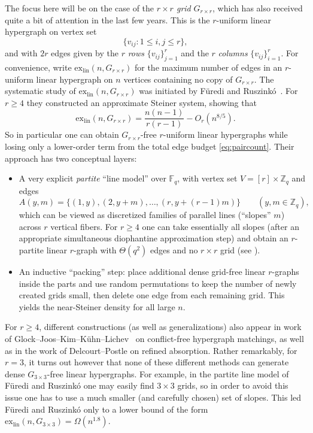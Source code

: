 \documentclass[11pt]{article}
\theoremstyle{definition}
\theoremstyle{remark}
\newcommand{\F}{\mathbb{F}}
\begin{document}
The focus here will be on the case of the \emph{$r\times r$ grid} $G_{r\times r}$, which has also received quite a bit of attention in the last few years. This is the $r$-uniform linear hypergraph on vertex set
\[
\{v_{ij}: 1\le i,j\le r\},
\]
and with $2r$ edges given by the $r$ \emph{rows} $\{v_{ij}\}_{j=1}^r$ and the $r$ \emph{columns} $\{v_{ij}\}_{i=1}^r$.
For convenience, write $\mathrm{ex}_{\mathrm{lin}}(n,G_{r\times r})$ for the maximum number of edges in an $r$-uniform linear hypergraph on $n$ vertices containing no copy of $G_{r\times r}$.
The systematic study of $\mathrm{ex}_{\mathrm{lin}}(n,G_{r\times r})$ was initiated by F\"uredi and Ruszink\'o~\cite{FurediRuszinko}. For $r\ge4$ they constructed an approximate Steiner system, showing that
\[
\mathrm{ex}_{\mathrm{lin}}(n,G_{r\times r})
=
\frac{n(n-1)}{r(r-1)}-O_r(n^{8/5}).
\]
So in particular one can obtain $G_{r\times r}$-free $r$-uniform linear hypergraphs while losing only a lower-order term from the total edge budget \eqref{eq:paircount}. Their approach has two conceptual layers:
\begin{itemize}[leftmargin=2em]
\item
A very explicit \emph{partite} ``line model'' over $\F_q$, with vertex set $V=[r]\times \mathbb{Z}_q$ and edges
\[
A(y,m)=\{(1,y),(2,y+m),\dots,(r,y+(r-1)m)\}\qquad (y,m\in\mathbb{Z}_q),
\]
which can be viewed as discretized families of parallel lines (``slopes'' $m$) across $r$ vertical fibers.
For $r\ge4$ one can take essentially all slopes (after an appropriate simultaneous diophantine approximation step) and obtain an $r$-partite linear $r$-graph with $\Theta(q^2)$ edges and no $r\times r$ grid
(see \cite[\S3.1--3.2]{FurediRuszinko}).
\item
An inductive ``packing'' step: place additional dense grid-free linear $r$-graphs inside the parts and use random
permutations to keep the number of newly created grids small, then delete one edge from each remaining grid.
This yields the near-Steiner density for all large $n$.
\end{itemize}
For $r \geq 4$, different constructions (as well as generalizations) also appear in work of Glock--Joos--Kim--K\"uhn--Lichev~\cite[Theorem~1.6]{conflictfree} on conflict-free hypergraph matchings, as well as in the work of Delcourt--Postle \cite{DP} on refined absorption. Rather remarkably, for $r=3$, it turns out however that none of these different methods can generate dense $G_{3 \times 3}$-free linear hypergraphs. For example, in the partite line model of F\"uredi and Ruszink\'o one may easily find $3\times3$ grids, so in order to avoid this issue one has to use a much smaller (and carefully chosen) set of slopes. This led F\"uredi and Ruszink\'o only to a lower bound of the form $\mathrm{ex}_{\mathrm{lin}}(n,G_{3\times 3}) = \Omega(n^{1.8})$. 
\end{document}
